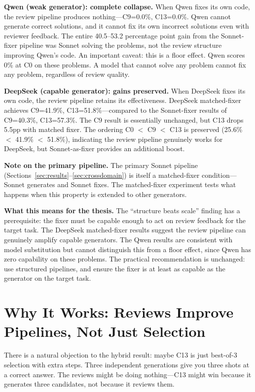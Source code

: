 \documentclass{article}
\begin{document}
\textbf{Qwen (weak generator): complete collapse.} When Qwen fixes its own code, the review pipeline produces nothing---C9=0.0\%, C13=0.0\%. Qwen cannot generate correct solutions, and it cannot fix its own incorrect solutions even with reviewer feedback. The entire 40.5--53.2 percentage point gain from the Sonnet-fixer pipeline was Sonnet solving the problems, not the review structure improving Qwen's code. An important caveat: this is a floor effect. Qwen scores 0\% at C0 on these problems. A model that cannot solve any problem cannot fix any problem, regardless of review quality.

\textbf{DeepSeek (capable generator): gains preserved.} When DeepSeek fixes its own code, the review pipeline retains its effectiveness. DeepSeek matched-fixer achieves C9=41.9\%, C13=51.8\%---compared to the Sonnet-fixer results of C9=40.3\%, C13=57.3\%. The C9 result is essentially unchanged, but C13 drops 5.5pp with matched fixer. The ordering C0 $<$ C9 $<$ C13 is preserved (25.6\% $<$ 41.9\% $<$ 51.8\%), indicating the review pipeline genuinely works for DeepSeek, but Sonnet-as-fixer provides an additional boost.

\textbf{Note on the primary pipeline.} The primary Sonnet pipeline (Sections~\ref{sec:results}--\ref{sec:crossdomain}) is itself a matched-fixer condition---Sonnet generates and Sonnet fixes. The matched-fixer experiment tests what happens when this property is extended to other generators.

\textbf{What this means for the thesis.} The ``structure beats scale'' finding has a prerequisite: the fixer must be capable enough to act on review feedback for the target task. The DeepSeek matched-fixer results suggest the review pipeline can genuinely amplify capable generators. The Qwen results are consistent with model substitution but cannot distinguish this from a floor effect, since Qwen has zero capability on these problems. The practical recommendation is unchanged: use structured pipelines, and ensure the fixer is at least as capable as the generator on the target task.

\section{Why It Works: Reviews Improve Pipelines, Not Just Selection}
\label{sec:whyitworks}

There is a natural objection to the hybrid result: maybe C13 is just best-of-3 selection with extra steps. Three independent generations give you three shots at a correct answer. The reviews might be doing nothing---C13 might win because it generates three candidates, not because it reviews them.
\end{document}

